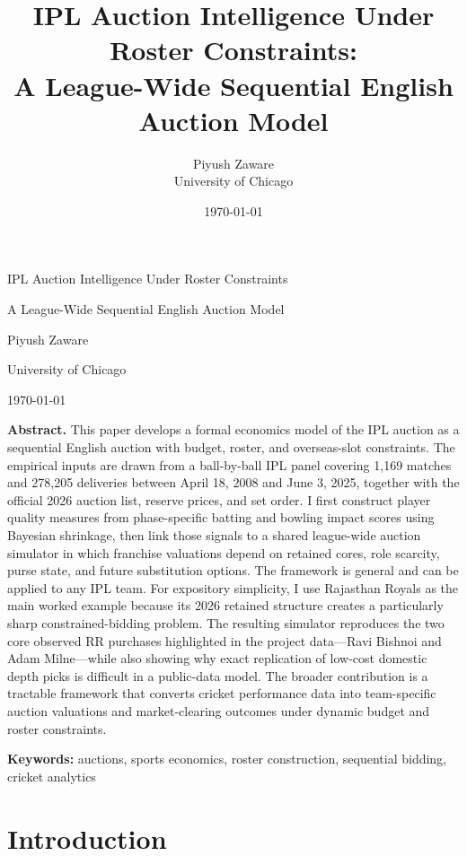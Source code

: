 \documentclass[11pt]{article}
\title{\textbf{IPL Auction Intelligence Under Roster Constraints:}\\
\textbf{A League-Wide Sequential English Auction Model}}
\author{Piyush Zaware\\University of Chicago}
\date{\today}
\begin{document}
\begin{titlepage}
\centering
{\Large IPL Auction Intelligence Under Roster Constraints\par}
\vspace{0.35cm}
{\Large A League-Wide Sequential English Auction Model\par}
\vspace{1.5cm}
{\normalsize Piyush Zaware\par}
{\normalsize University of Chicago\par}
\vspace{0.5cm}
{\normalsize \today\par}
\vfill
\begin{minipage}{0.9\textwidth}
\small
\textbf{Abstract.} This paper develops a formal economics model of the IPL auction as a sequential English auction with budget, roster, and overseas-slot constraints. The empirical inputs are drawn from a ball-by-ball IPL panel covering 1{,}169 matches and 278{,}205 deliveries between April 18, 2008 and June 3, 2025, together with the official 2026 auction list, reserve prices, and set order. I first construct player quality measures from phase-specific batting and bowling impact scores using Bayesian shrinkage, then link those signals to a shared league-wide auction simulator in which franchise valuations depend on retained cores, role scarcity, purse state, and future substitution options. The framework is general and can be applied to any IPL team. For expository simplicity, I use Rajasthan Royals as the main worked example because its 2026 retained structure creates a particularly sharp constrained-bidding problem. The resulting simulator reproduces the two core observed RR purchases highlighted in the project data---Ravi Bishnoi and Adam Milne---while also showing why exact replication of low-cost domestic depth picks is difficult in a public-data model. The broader contribution is a tractable framework that converts cricket performance data into team-specific auction valuations and market-clearing outcomes under dynamic budget and roster constraints.
\end{minipage}
\vfill
\begin{minipage}{0.9\textwidth}
\small
\textbf{Keywords:} auctions, sports economics, roster construction, sequential bidding, cricket analytics
\end{minipage}
\end{titlepage}

\section{Introduction}
\end{document}
